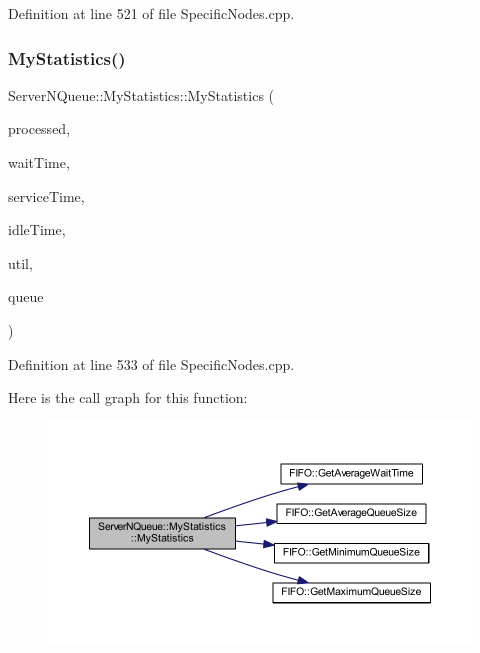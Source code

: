 Definition at line 521 of file Specific\+Nodes.\+cpp.

\mbox{\label{class_server_n_queue_1_1_my_statistics_ac6ab7a50b89919760fd2eb60a777c1bd}} 
\subsubsection{\texorpdfstring{My\+Statistics()}{MyStatistics()}\hspace{0.1cm}{\footnotesize\ttfamily [2/2]}}
{\footnotesize\ttfamily Server\+N\+Queue\+::\+My\+Statistics\+::\+My\+Statistics (\begin{DoxyParamCaption}\item[{int}]{processed,  }\item[{double}]{wait\+Time,  }\item[{double}]{service\+Time,  }\item[{double}]{idle\+Time,  }\item[{double}]{util,  }\item[{\hyperlink{class_f_i_f_o}{F\+I\+FO} $\ast$}]{queue }\end{DoxyParamCaption})\hspace{0.3cm}{\ttfamily [inline]}}



Definition at line 533 of file Specific\+Nodes.\+cpp.

Here is the call graph for this function\+:\nopagebreak
\begin{figure}[H]
\begin{center}
\leavevmode
\includegraphics[width=350pt]{class_server_n_queue_1_1_my_statistics_ac6ab7a50b89919760fd2eb60a777c1bd_cgraph}
\end{center}
\end{figure}


